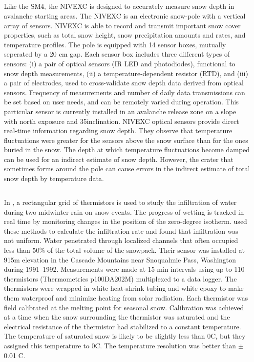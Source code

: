 \subsection{\cite{barbolininivexc}}  
Like the SM4, the NIVEXC is designed to accurately measure snow depth in avalanche starting areas. The NIVEXC is an electronic snow-pole with a vertical array of sensors. NIVEXC is able to record and transmit important snow cover properties, such as total snow height, snow precipitation amounts and rates, and temperature profiles. The pole is equipped with 14 sensor boxes, mutually seperated by a 20 cm gap. Each sensor box includes three different types of sensors: (i) a pair of optical sensors (IR LED and photodiodes), functional to snow depth measurements, (ii) a temperature-dependent resistor (RTD), and (iii) a pair of electrodes, used to cross-validate snow depth data derived from optical sensors. Frequency of measurements and number of daily data transmissions can be set based on user needs, and can be remotely varied during operation. This particular sensor is currently installed in an avalanche release zone on a slope with north exposure and 35\textdegree inclination. NIVEXC optical sensors provide direct real-time information regarding snow depth. They observe that temperature fluctuations were greater for the sensors above the snow surface than for the ones buried in the snow. The depth at which temperature fluctuations become damped can be used for an indirect estimate of snow depth. However, the crater that sometimes forms around the pole can cause errors in the indirect estimate of total snow depth by temperature data. 

\subsection{\cite{conway_benedict_1994}} 
In \cite{conway_benedict_1994}, a rectangular grid of thermistors is used to study the infiltration of water during two midwinter rain on snow events. The progress of wetting is tracked in real time by monitoring changes in the position of the zero-degree isotherm. \cite{conway_benedict_1994} used these methods to calculate the infiltration rate and found that infiltration was not uniform. Water penetrated through localized channels that often occupied less than 50\% of the total volume of the snowpack. Their sensor was installed at 915m elevation in the Cascade Mountains near Snoqualmie Pass, Washington during 1991--1992. Measurements were made at 15-min intervals using up to 110 thermistors (Thermometrics p100DA202M) multiplexed to a data logger. The thermistors were wrapped in white heat-shrink tubing and white epoxy to make them waterproof and minimize heating from solar radiation. Each thermistor was field calibrated at the melting point for seasonal snow. Calibration was achieved at a time when the snow surrounding the thermistor was saturated and the electrical resistance of the thermistor had stabilized to a constant temperature. The temperature of saturated snow is likely to be slightly less than 0\textdegree C, but they assigned this temperature to 0\textdegree C. The temperature resolution was better than $\pm$ 0.01 \textdegree C.
 
